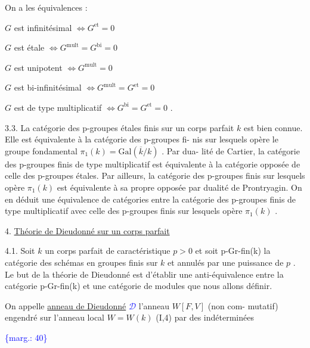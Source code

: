 \documentclass[11pt]{article}
\newcommand{\scanpage}[1]{\par\bigskip\noindent{\small\sffamily[scan #1]}\par}
\newcommand{\mspage}[1]{{\small\sffamily[p.\,#1]}}
\newcommand{\hand}[1]{\textcolor{blue}{#1}}
\newcommand{\margin}[1]{\textcolor{blue}{\{\textsf{marg.:} #1\}}}
\newcommand{\uline}[1]{\underline{#1}}
\begin{document}
\mspage{\hand{39}}

\clearpage
\scanpage{129/40}
\mspage{\hand{II.12}}

On a les équivalences :

$G$ est infinitésimal $\Longleftrightarrow G^{\mathrm{et}} = 0$

$G$ est étale $\Longleftrightarrow G^{\mathrm{mult}} = G^{\mathrm{bi}} = 0$

$G$ est unipotent $\Longleftrightarrow G^{\mathrm{mult}} = 0$

$G$ est bi-infinitésimal $\Longleftrightarrow G^{\mathrm{mult}} = G^{\mathrm{et}} = 0$

$G$ est de type multiplicatif $\Longleftrightarrow G^{\mathrm{bi}} = G^{\mathrm{et}} = 0$ .

3.3. La catégorie des p-groupes étales finis sur un corps parfait
$k$ est bien connue. Elle est équivalente à la catégorie des p-groupes fi-%
nis sur lesquels opère le groupe fondamental $\pi_1(k) = \mathrm{Gal}(\overline{k}/k)$ . Par dua-%
lité de Cartier, la catégorie des p-groupes finis de type multiplicatif
est équivalente à la catégorie opposée de celle des p-groupes étales. Par
ailleurs, la catégorie des p-groupes finis sur lesquels opère $\pi_1(k)$ est
équivalente à sa propre opposée par dualité de Prontryagin. On en déduit
une équivalence de catégories entre la catégorie des p-groupes finis de
type multiplicatif avec celle des p-groupes finis sur lesquels opère $\pi_1(k)$ .

4. \uline{Théorie de Dieudonné sur un corps parfait}

4.1. Soit $k$ un corps parfait de caractéristique $p > 0$ et soit
p-Gr-fin(k) la catégorie des schémas en groupes finis sur $k$ et annulés
par une puissance de $p$ . Le but de la théorie de Dieudonné est d'établir
une anti-équivalence entre la catégorie p-Gr-fin(k) et une catégorie de
modules que nous allons définir.

On appelle \uline{anneau de Dieudonné} \hand{$\mathcal{D}$} l'anneau $W[F,V]$ (non com-%
mutatif) engendré sur l'anneau local $W = W(k)$ (I,4) par des indéterminées

\margin{40}

\clearpage
\scanpage{129/41}
\mspage{\hand{II.13}}
\end{document}
